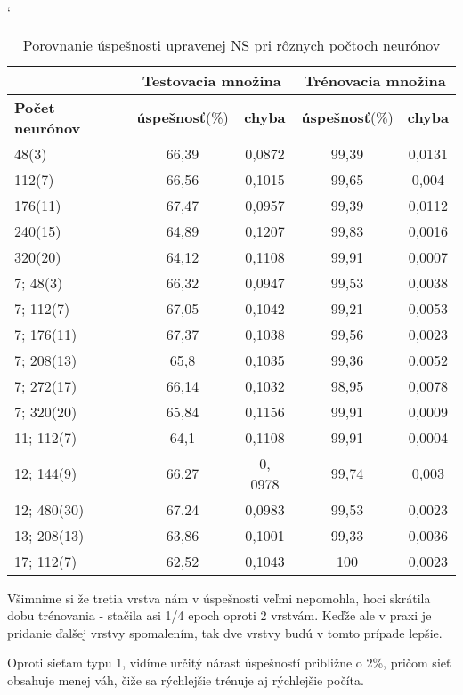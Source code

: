 \begin{table}[h]
\catcode` %
\centering
\begin{tabular}{|l|c|c|c|c|}
\cline{2-5}
\multicolumn{1}{l}{} & \multicolumn{2}{|c|}{\textbf{Testovacia množina}} & \multicolumn{2}{c|}{\textbf{Trénovacia množina}}\\ 
\hline
\textbf{Počet neurónov} & \textbf{úspešnosť}(\%) & \textbf{chyba} & \textbf{úspešnosť}(\%) & \textbf{chyba} \\ \hline
48(3)& 66,39 & 0,0872 & 99,39 & 0,0131 \\ \hline
112(7)& 66,56 & 0,1015 & 99,65 & 0,004 \\ \hline 
176(11)& 67,47 & 0,0957 & 99,39 & 0,0112 \\ \hline
240(15)& 64,89 & 0,1207 & 99,83 & 0,0016 \\ \hline
320(20)& 64,12 & 0,1108 & 99,91 & 0,0007 \\ \hline
7; 48(3)& 66,32 & 0,0947 & 99,53 & 0,0038 \\ \hline 
7; 112(7)& 67,05 & 0,1042 & 99,21 & 0,0053 \\ \hline 
7; 176(11)& 67,37 & 0,1038 & 99,56 & 0,0023 \\ \hline
7; 208(13)& 65,8  & 0,1035 & 99,36 & 0,0052 \\ \hline 
7; 272(17)& 66,14 & 0,1032 & 98,95 & 0,0078 \\ \hline 
7; 320(20)& 65,84& 0,1156 & 99,91 & 0,0009\\ \hline 
11; 112(7)& 64,1 & 0,1108 & 99,91 & 0,0004 \\ \hline
12; 144(9)& 66,27 & 0, 0978 & 99,74 & 0,003 \\ \hline
12; 480(30)& 67.24 & 0,0983 & 99,53 & 0,0023 \\ \hline 
13; 208(13)& 63,86 & 0,1001 & 99,33 & 0,0036 \\ \hline 
17; 112(7)& 62,52 & 0,1043 & 100 & 0,0023 \\ \hline
\end{tabular}
\caption{Porovnanie úspešnosti upravenej NS pri rôznych počtoch neurónov}
\label{tab:neuroncountcmp2}
\end{table}

Všimnime si že tretia vrstva nám v úspešnosti veľmi nepomohla, hoci skrátila dobu trénovania - stačila asi 1/4 epoch oproti 2 vrstvám. Keďže ale v praxi je pridanie ďalšej vrstvy spomalením, tak dve vrstvy budú v tomto prípade lepšie.

Oproti sieťam typu 1, vidíme určitý nárast úspešností približne o 2\%, pričom sieť obsahuje menej váh, čiže sa rýchlejšie trénuje aj rýchlejšie počíta.

